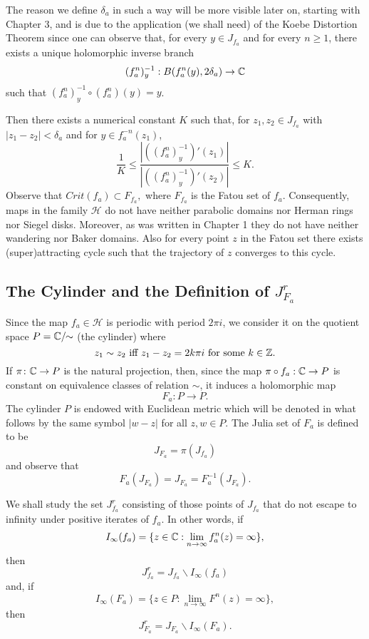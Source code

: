 The reason we define $\delta_a$ in such a way will be more visible later on,
starting with Chapter 3, and is due to the application (we shall need) of
the Koebe Distortion Theorem since one can observe that, for every $y \in
J_{f_a}$ and for every $n \geq 1$, there exists a unique holomorphic inverse
branch
\[
(f^n_a)^{-1}_y :B(f^n_a(y), 2\delta_a)\to {\mathbb C}
\]
such that $(f^n_a)^{-1}_y \circ (f^n_a)(y)=y$.

Then there exists a numerical constant $K$ such that, for $z_1,z_2\in
J_{f_a}$ with $|z_1-z_2|<\delta_a$ and for $y\in f_a^{-n}(z_1)$,
\begin{equation}
  \label{eq:12}
  \frac{1}{K}\leq\frac
  {|((f^n_a)^{-1}_y)'(z_1)|}{|((f^n_a)^{-1}_ y)'(z_2)|}\leq K.
\end{equation}
Observe that $Crit(f_a)\subset F_{f_a},$ where $F_{f_a}$ is the Fatou set of
$f_a.$ Consequently, maps in the family $\mathcal{H}$ do not have neither
parabolic domains nor Herman rings nor Siegel disks.  Moreover, as was
written in Chapter 1 they do not have neither wandering nor Baker
domains. Also for every point $z$ in the Fatou set there exists
(super)attracting cycle such that the trajectory of $z$ converges to this
cycle.

\subsection{The Cylinder and the Definition of
  \texorpdfstring{$J^r_{F_a}$}{JrFa}}

Since the map $f_a \in \mathcal{H}$ is periodic with period $2\pi i$, we
consider it on the quotient space $P={\mathbb C}/\!\!\sim$ (the cylinder) where
\[
z_1 \sim z_2 \textrm { iff } z_1-z_2=2k\pi i \textrm { for some } k\in {\mathbb Z}.
\]
If $\pi \colon {\mathbb C} \rightarrow P$ is the natural projection, then, since
the map $\pi \circ f_a :{\mathbb C} \rightarrow P$ is constant on equivalence
classes of relation $\sim$, it induces a holomorphic map
\[
F_a :P\rightarrow P.
\]
The cylinder $P$ is endowed with Euclidean metric which will be denoted in
what follows by the same symbol $|w-z|$ for all $z,w \in P.$ The Julia set
of $F_a$ is defined to be
\[
J_{F_a}=\pi (J_{f_a})
\]
and observe that
\[
F_a(J_{F_a})=J_{F_a}=F_a^{-1}(J_{F_a}).
\]

We shall study the set $J^r_{f_a}$ consisting of those points of $J_{f_a}$
that do not escape to infinity under positive iterates of $f_a.$ In other
words, if
\[
I_\infty(f_a)=\{z\in {\mathbb C}: \lim_{n\to \infty}f_a^n(z)=\infty\},
\]
then
\[
J^r_{f_a}=J_{f_a}\backslash I_\infty(f_a) 
\]
and, if
\[
I_\infty(F_a)=\{z\in P: \lim_{n\to\infty}F^n(z)=\infty\},
\]
then 
\[
J^r_{F_a}=J_{F_a}\backslash I_\infty(F_a).
\]

